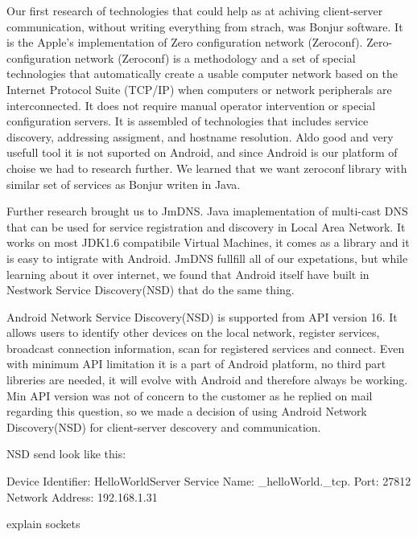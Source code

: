 Our first research of technologies that could help as at achiving client-server communication, without writing everything from strach, was Bonjur software. 
It is the Apple's implementation of Zero configuration network (Zeroconf). 
Zero-configuration network (Zeroconf)  is a methodology and a set of special technologies that automatically create a usable computer network based on the Internet Protocol Suite (TCP/IP) when computers or network peripherals are interconnected. 
It does not require manual operator intervention or special configuration servers.
It is assembled of technologies that includes service discovery, addressing assigment, and hostname resolution.
Aldo good and very usefull tool it is not suported on Android, and since Android is our platform of choise we had to research further. 
We learned that we want zeroconf library with similar set of services as Bonjur writen in Java.


Further research brought us to JmDNS. Java imaplementation of multi-cast DNS that can be used for service registration and discovery in Local Area Network. 
It works on most JDK1.6 compatibile Virtual Machines, it comes as a library and it is easy to intigrate with Android. 
JmDNS fullfill all of our expetations, but while learning about it over internet, we found that Android itself have built in Nestwork Service Discovery(NSD) that do the same thing.


Android Network Service Discovery(NSD) is supported from API version 16. 
It allows users to identify other devices on the local network, register services, broadcast connection information, scan for registered services and connect.
Even with minimum API limitation it is a part of Android platform, no third part libreries are needed, it will evolve with Android and therefore always be working.
Min API version was not of concern to the customer as he replied on mail regarding this question, so we made a decision of using Android Network Discovery(NSD) for client-server descovery and communication.

NSD send look like this:

Device Identifier: HelloWorldServer
Service Name: \_helloWorld.\_tcp.
Port: 27812
Network Address: 192.168.1.31

explain sockets

